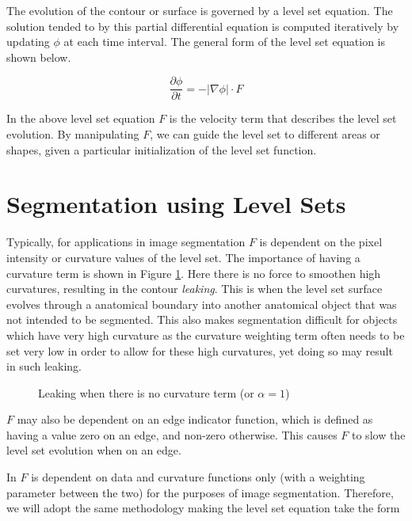 The evolution of the contour or surface is governed by a level set equation. The solution tended to by this partial differential equation is computed iteratively by updating $\phi$ at each time interval. The general form of the level set equation is shown below.

	\begin{equation}
	\frac{\partial{\phi}}{\partial{t}}=-|\nabla{\phi|}\cdot F
	\label{eq:levelsetequation}
	\end{equation}

In the above level set equation $F$ is the velocity term that describes the level set evolution. By manipulating $F$, we can guide the level set to different areas or shapes, given a particular initialization of the level set function. 

\section{Segmentation using Level Sets}\label{thresholding}
Typically, for applications in image segmentation $F$ is dependent on the pixel intensity or curvature values of the level set. The importance of having a curvature term is shown in Figure \ref{leaking}. Here there is no force to smoothen high curvatures, resulting in the contour \textit{leaking}. This is when the level set surface evolves through a anatomical boundary into another anatomical object that was not intended to be segmented. This also makes segmentation difficult for objects which have very high curvature as the curvature weighting term often needs to be set very low in order to allow for these high curvatures, yet doing so may result in such leaking.

\begin{figure}[h]
	\centering
	\caption{Leaking when there is no curvature term (or $\alpha = 1$)}
	\label{leaking}
\end{figure}

$F$ may also be dependent on an edge indicator function, which is defined as having a value zero on an edge, and non-zero otherwise. This causes $F$ to slow the level set evolution when on an edge.

In \cite{Lefohn04astreaming} $F$ is dependent on data and curvature functions only (with a weighting parameter between the two) for the purposes of image segmentation. Therefore, we will adopt the same methodology making the level set equation take the form

